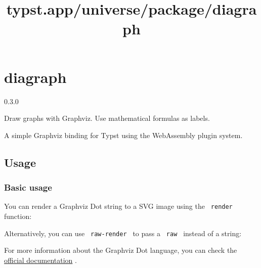 \title{typst.app/universe/package/diagraph}

\label{banner}
\section{diagraph}\label{diagraph}

{ 0.3.0 }

Draw graphs with Graphviz. Use mathematical formulas as labels.

\label{readme}
A simple Graphviz binding for Typst using the WebAssembly plugin system.

\subsection{Usage}\label{usage}

\subsubsection{Basic usage}\label{basic-usage}

You can render a Graphviz Dot string to a SVG image using the
\texttt{\ render\ } function:

\begin{Shaded}
\begin{Highlighting}[]
\end{Highlighting}
\end{Shaded}

Alternatively, you can use \texttt{\ raw-render\ } to pass a
\texttt{\ raw\ } instead of a string:

\begin{Shaded}
\begin{Highlighting}[]
\NormalTok{  \}}
\NormalTok{  \textasciigrave{}\textasciigrave{}\textasciigrave{}}
\NormalTok{)}
\end{Highlighting}
\end{Shaded}


For more information about the Graphviz Dot language, you can check the
\href{https://graphviz.org/documentation/}{official documentation} .

